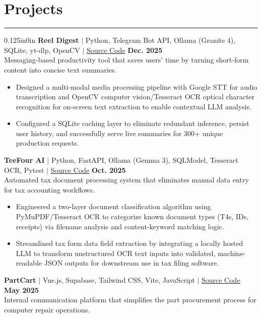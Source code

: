 \documentclass[11pt]{article}
\begin{document}
    \section*{\large Projects}
    \hrule 
    \vspace{0.4em}
    \begin{adjustwidth}{0.125in}{0in}
        \textbf{Reel Digest} $\vert$ Python, Telegram Bot API, Ollama (Granite 4), SQLite, yt-dlp, OpenCV $\vert$ \href{https://github.com/nathan-au/reel-digest}{\underline{Source Code}} \hfill \textbf{Dec. 2025}\\
        Messaging-based productivity tool that saves users' time by turning short-form content into concise text summaries.
        \begin{itemize}
            \item Designed a multi-modal media processing pipeline with Google STT for audio transcription and OpenCV computer vision/Tesseract OCR optical character recognition for on-screen text extraction to enable contextual LLM analysis.
            \item Configured a SQLite caching layer to eliminate redundant inference, persist user history, and successfully serve live summaries for 300+ unique production requests.
        \end{itemize}
        \textbf{TeeFour AI} $\vert$ Python, FastAPI, Ollama (Gemma 3), SQLModel, Tesseract OCR, Pytest $\vert$ \href{https://github.com/nathan-au/teefour-ai}{\underline{Source Code}} \hfill \textbf{Oct. 2025}\\
        Automated tax document processing system that eliminates manual data entry for tax accounting workflows.
        \begin{itemize}
            \item Engineered a two-layer document classification algorithm using PyMuPDF/Tesseract OCR to categorize known document types (T4s, IDs, receipts) via filename analysis and content-keyword matching logic.
            \item Streamlined tax form data field extraction by integrating a locally hosted LLM to transform unstructured OCR text inputs into validated, machine-readable JSON outputs for downstream use in tax filing software.
        \end{itemize}
        \textbf{PartCart} $\vert$ Vue.js, Supabase, Tailwind CSS, Vite, JavaScript $\vert$ \href{https://github.com/nathan-au/part-cart}{\underline{Source Code}} \hfill \textbf{May 2025}\\
        Internal communication platform that simplifies the part procurement process for computer repair operations.

\end{adjustwidth}
\end{document}
